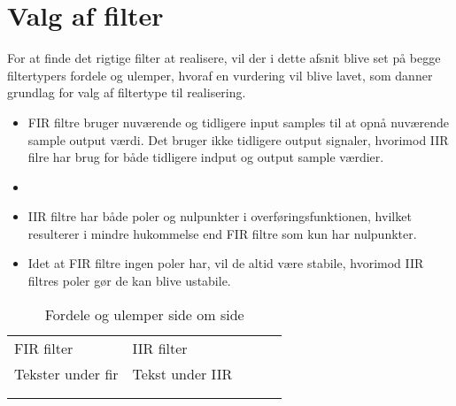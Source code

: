 \section{Valg af filter}\label{sec:dec_filter}
For at finde det rigtige filter at realisere, vil der i dette afsnit blive set på begge filtertypers fordele og ulemper, hvoraf en vurdering vil blive lavet, som danner grundlag for valg af filtertype til realisering.

\begin{itemize}
	\item FIR filtre bruger nuværende og tidligere input samples til at opnå nuværende sample output værdi. Det bruger ikke tidligere output signaler, hvorimod IIR filre har brug for både tidligere indput og output sample værdier.
	\item 
	\item IIR filtre har både poler og nulpunkter i overføringsfunktionen, hvilket resulterer i mindre hukommelse end FIR filtre som kun har nulpunkter.
	\item Idet at FIR filtre ingen poler har, vil de altid være stabile, hvorimod IIR filtres poler gør de kan blive ustabile.
\end{itemize}




\begin{table}[]
	\centering
	\caption{Fordele og ulemper side om side}
	\label{iir_fir_vurdering}
	\begin{tabular}{lllll}
		\cline{1-2}
		\multicolumn{1}{|l|}{\centering FIR filter} & \multicolumn{1}{l|}{\centering IIR filter} &  &  &  \\ \cline{1-2}
		\multicolumn{1}{|l|}{Tekster under fir}		& \multicolumn{1}{l|}{Tekst under IIR}		 &  &  &  \\ \cline{1-2}
		&                       &  &  &  \\
		&                       &  &  & 
	\end{tabular}
\end{table}
